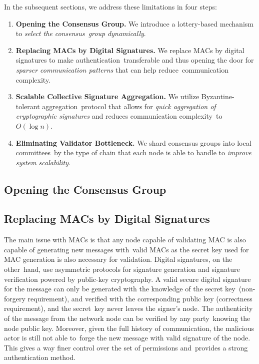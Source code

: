 In the subsequent sections, we address these limitations in four steps:
\begin{enumerate}
    \item \textbf{Opening the Consensus Group.} We introduce a lottery-based mechanism to \emph{select the consensus\
        group dynamically}.
    \item \textbf{Replacing MACs by Digital Signatures.} We replace MACs by digital signatures to make authentication\
    transferable and thus opening the door for \emph{sparser communication patterns} that can help reduce\
    communication complexity.
    \item \textbf{Scalable Collective Signature Aggregation.} We utilize Byzantine-tolerant aggregation\
    protocol that allows for \emph{quick aggregation of cryptographic signatures} and reduces communication complexity\
    to $O(\log{n})$.
    \item \textbf{Eliminating Validator Bottleneck.} We shard consensus groups into local committees\
    by the type of chain that each node is able to handle to \emph{improve system scalability}.
\end{enumerate}

\subsection{Opening the Consensus Group}\label{subsec:opening-consensus-group}


\subsection{Replacing MACs by Digital Signatures}\label{subsec:replacing-macs-by-digital-signatures}

The main issue with MACs is that any node capable of validating MAC is also capable of generating new messages with\
valid MACs as the secret key used for MAC generation is also necessary for validation.
Digital signatures, on the other\
hand, use asymmetric protocols for signature generation and signature verification powered by public-key cryptography.
A valid secure digital signature for the message can only be generated with the knowledge of the secret key\
(non-forgery requirement), and verified with the corresponding public key (correctness requirement), and the secret\
key never leaves the signer's node.
The authenticity of the message from the network node can be verified by any party\
knowing the node public key.
Moreover, given the full history of communication, the malicious actor is still not able to\
forge the new message with valid signature of the node.
This gives a way finer control over the set of permissions and\
provides a strong authentication method.

